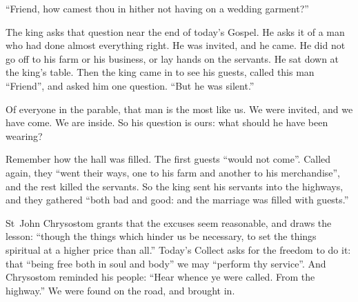 \raggedcolumns

``Friend, how camest thou in hither not having on a wedding garment?''

The king asks that question near the end of today's Gospel. He asks it of a man
who had done almost everything right. He was invited, and he came. He did not
go off to his farm or his business, or lay hands on the servants. He sat down
at the king's table. Then the king came in to see his guests, called this man
``Friend'', and asked him one question. ``But he was silent.''

Of everyone in the parable, that man is the most like us. We were invited, and
we have come. We are inside. So his question is ours: what should he have been
wearing?

\bigskip

Remember how the hall was filled. The first guests ``would not come''. Called
again, they ``went their ways, one to his farm and another to his
merchandise'', and the rest killed the servants. So the king sent his servants
into the highways, and they gathered ``both bad and good: and the marriage was
filled with guests.''

St~John Chrysostom grants that the excuses seem reasonable, and draws the
lesson: ``though the things which hinder us be necessary, to set the things
spiritual at a higher price than all.'' Today's Collect asks for the
freedom to do it: that ``being free both in soul and body'' we may ``perform
thy service''. And Chrysostom reminded his people: ``Hear whence ye were
called. From the highway.'' We were found on the road, and brought in.

